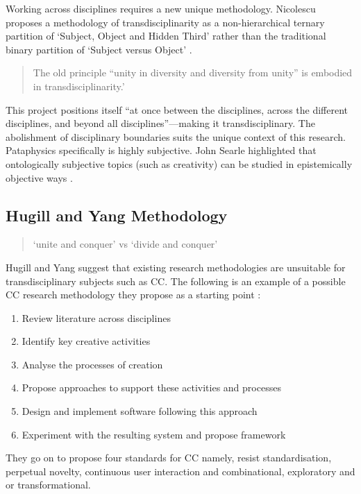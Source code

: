 \documentclass[11pt]{thesis} %
\begin{document}
Working across disciplines requires a new unique methodology. Nicolescu proposes a methodology of transdisciplinarity as a non-hierarchical ternary partition of `Subject, Object and Hidden Third' rather than the traditional binary partition of `Subject versus Object' \citeyear{Nicolescu2010}.

\begin{quotation}
  The old principle ``unity in diversity and diversity from unity'' is embodied in transdisciplinarity.' 
\end{quotation}

\spirals

This project positions itself ``at once between the disciplines, across the different disciplines, and beyond all disciplines''---making it transdisciplinary. The abolishment of disciplinary boundaries suits the unique context of this research. Pataphysics specifically is highly subjective. John Searle highlighted that ontologically subjective topics (such as creativity) can be studied in epistemically objective ways \citeyear{Searle2015}.

 




\subsection{Hugill and Yang Methodology}

\begin{quotation}
  `unite and conquer' vs `divide and conquer' 
\end{quotation}

\begin{draft}
  Hugill and Yang suggest that existing research methodologies are unsuitable for transdisciplinary subjects such as \ac{CC}. The following is an example of a possible \ac{CC} research methodology they propose as a starting point \autocite[p.17]{Hugill2013c}:

  \begin{enumerate}
    \item Review literature across disciplines
    \item Identify key creative activities
    \item Analyse the processes of creation
    \item Propose approaches to support these activities and processes
    \item Design and implement software following this approach
    \item Experiment with the resulting system and propose framework
  \end{enumerate}

  They go on to propose four standards for \ac{CC} \autocite[p.17]{Hugill2013c} namely, resist standardisation, perpetual novelty, continuous user interaction and combinational, exploratory and or transformational.
\end{draft}
\end{document}
